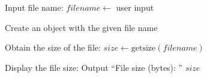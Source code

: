 \begin{algorithm}
\caption{Find the Size of a File}
\begin{algorithmic}[1]

\STATE Input file name:
\STATE $filename \gets$ user input

\STATE Create an object with the given file name

\STATE Obtain the size of the file:
\STATE $size \gets \text{getsize}(filename)$

\STATE Display the file size:
\STATE Output ``File size (bytes): '' $size$

\end{algorithmic}
\end{algorithm}